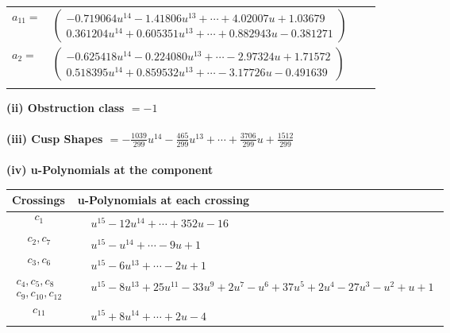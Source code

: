 \documentclass[1p]{elsarticle_modified}
\theoremstyle{definition}
\begin{document}
\begin{tabular}{m{7pt} m{180pt} m{7pt} m{180pt} }
\flushright $a_{11}=$&$\begin{pmatrix}-0.719064 u^{14}-1.41806 u^{13}+\cdots+4.02007 u+1.03679\\0.361204 u^{14}+0.605351 u^{13}+\cdots+0.882943 u-0.381271\end{pmatrix}$ \\
\flushright $a_{2}=$&$\begin{pmatrix}-0.625418 u^{14}-0.224080 u^{13}+\cdots-2.97324 u+1.71572\\0.518395 u^{14}+0.859532 u^{13}+\cdots-3.17726 u-0.491639\end{pmatrix}$\\&\end{tabular}
\flushleft \textbf{(ii) Obstruction class $= -1$}\\~\\
\flushleft \textbf{(iii) Cusp Shapes $= -\frac{1039}{299} u^{14}-\frac{465}{299} u^{13}+\cdots+\frac{3706}{299} u+\frac{1512}{299}$}\\~\\
\newpage\renewcommand{\arraystretch}{1}
\flushleft \textbf{(iv) u-Polynomials at the component}\newline \\
\begin{tabular}{m{50pt}|m{274pt}}
Crossings & \hspace{64pt}u-Polynomials at each crossing \\
\hline $$\begin{aligned}c_{1}\end{aligned}$$&$\begin{aligned}
&u^{15}-12 u^{14}+\cdots+352 u-16
\end{aligned}$\\
\hline $$\begin{aligned}c_{2},c_{7}\end{aligned}$$&$\begin{aligned}
&u^{15}- u^{14}+\cdots-9 u+1
\end{aligned}$\\
\hline $$\begin{aligned}c_{3},c_{6}\end{aligned}$$&$\begin{aligned}
&u^{15}-6 u^{13}+\cdots-2 u+1
\end{aligned}$\\
\hline $$\begin{aligned}c_{4},c_{5},c_{8}\\c_{9},c_{10},c_{12}\end{aligned}$$&$\begin{aligned}
&u^{15}-8 u^{13}+25 u^{11}-33 u^9+2 u^7- u^6+37 u^5+2 u^4-27 u^3- u^2+u+1
\end{aligned}$\\
\hline $$\begin{aligned}c_{11}\end{aligned}$$&$\begin{aligned}
&u^{15}+8 u^{14}+\cdots+2 u-4
\end{aligned}$\\
\hline
\end{tabular}\\~\\
\end{document}
